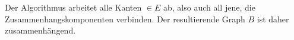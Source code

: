 \begin{solution}
\begin{enumerate}[label = (\Alph*)]
    Der Algorithmus arbeitet alle Kanten $\in E$ ab, also auch all jene, die Zusammenhangskomponenten verbinden.
    Der resultierende Graph $B$ ist daher zusammenhängend.

\end{enumerate}

\end{solution}

